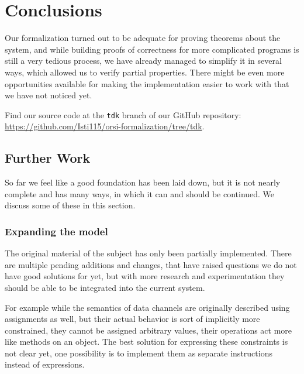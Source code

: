 \chapter{Conclusions}
\label{chp:conclusions}

Our formalization turned out to be adequate for proving theorems about the system, and while building proofs of correctness for more complicated programs is still a very tedious process, we have already managed to simplify it in several ways, which allowed us to verify partial properties. There might be even more opportunities available for making the implementation easier to work with that we have not noticed yet.

Find our source code at the \verb|tdk| branch of our GitHub repository: \url{https://github.com/Isti115/orsi-formalization/tree/tdk}.

\section{Further Work}

So far we feel like a good foundation has been laid down, but it is not nearly complete and has many ways, in which it can and should be continued. We discuss some of these in this section.

\subsection{Expanding the model}

The original material of the subject has only been partially implemented. There are multiple pending additions and changes, that have raised questions we do not have good solutions for yet, but with more research and experimentation they should be able to be integrated into the current system.

For example while the semantics of data channels are originally described using assignments as well, but their actual behavior is sort of implicitly more constrained, they cannot be assigned arbitrary values, their operations act more like methods on an object. The best solution for expressing these constraints is not clear yet, one possibility is to implement them as separate instructions instead of expressions.

